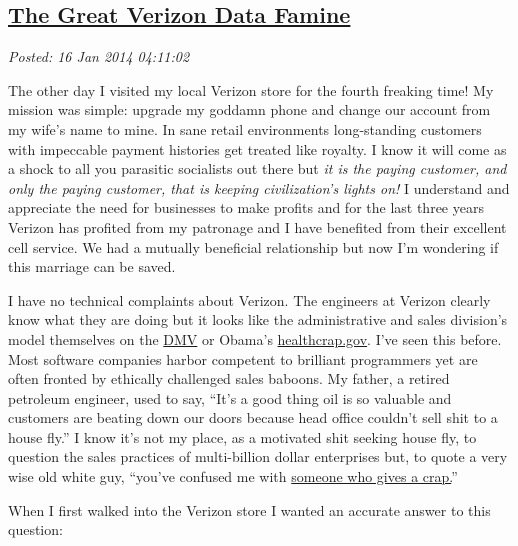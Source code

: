 %

\subsection*{\href{https://bakerjd99.wordpress.com/2014/01/15/the-great-verizon-data-famine/}{The Great Verizon Data Famine}}


\noindent\emph{Posted: 16 Jan 2014 04:11:02}
\vspace{6pt}

The other day I visited my local Verizon store for the fourth freaking
time! My mission was simple: upgrade my goddamn phone and change our
account from my wife's name to mine. In sane retail environments
long-standing customers with impeccable payment histories get treated
like royalty. I know it will come as a shock to all you parasitic
socialists out there but \emph{it is the paying customer, and only the
paying customer, that is keeping civilization's lights on!} I understand
and appreciate the need for businesses to make profits and for the last
three years Verizon has profited from my patronage and I have benefited
from their excellent cell service. We had a mutually beneficial
relationship but now I'm wondering if this marriage can be saved.

I have no technical complaints about Verizon. The engineers at Verizon
clearly know what they are doing but it looks like the administrative
and sales division's model themselves on the
\href{http://www.urbandictionary.com/define.php?term=DMV}{DMV} or
Obama's \href{http://obamacaregov.us/}{healthcrap.gov}. I've seen this
before. Most software companies harbor competent to brilliant
programmers yet are often fronted by ethically challenged sales baboons.
My father, a retired petroleum engineer, used to say, ``It's a good
thing oil is so valuable and customers are beating down our doors
because head office couldn't sell shit to a house fly.'' I know it's not
my place, as a motivated shit seeking house fly, to question the sales
practices of multi-billion dollar enterprises but, to quote a very wise
old white guy, ``you've confused me with
\href{http://www.urbandictionary.com/define.php?term=call\%20someone\%20who\%20gives\%20a\%20shit}{someone
who gives a crap.}''

\medskip

When I first walked into the Verizon store I wanted an accurate answer
to this question:

\medskip

